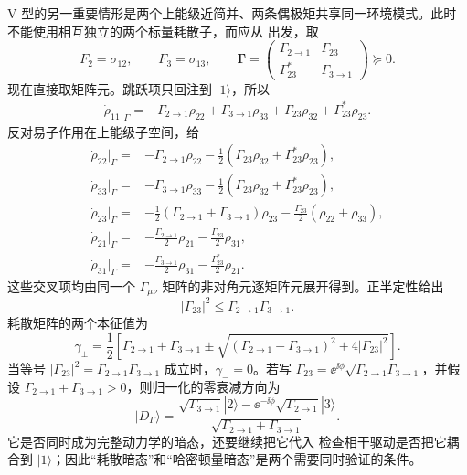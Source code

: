 \begin{exbox}[V 型]
V 型的另一重要情形是两个上能级近简并、两条偶极矩共享同一环境模式。此时不能使用相互独立的两个标量耗散子，而应从 出发，取
\[
F_2=\sigma_{12},\qquad F_3=\sigma_{13},
\qquad
\boldsymbol\Gamma=
\begin{pmatrix}
\Gamma_{2\to1}&\Gamma_{23}\\
\Gamma_{23}^*&\Gamma_{3\to1}
\end{pmatrix}\succeq0.
\]
现在直接取矩阵元。跳跃项只回注到 $|1\rangle$，所以
\begin{align}
\dot\rho_{11}\big|_{\Gamma}
={}&\Gamma_{2\to1}\rho_{22}+\Gamma_{3\to1}\rho_{33}
+\Gamma_{23}\rho_{32}+\Gamma_{23}^*\rho_{23}.
\end{align}
反对易子作用在上能级子空间，给
\begin{align}
\dot\rho_{22}\big|_{\Gamma}
={}&-\Gamma_{2\to1}\rho_{22}
-\frac12(\Gamma_{23}\rho_{32}+\Gamma_{23}^*\rho_{23}),\\
\dot\rho_{33}\big|_{\Gamma}
={}&-\Gamma_{3\to1}\rho_{33}
-\frac12(\Gamma_{23}\rho_{32}+\Gamma_{23}^*\rho_{23}),\\
\dot\rho_{23}\big|_{\Gamma}
={}&-\frac12(\Gamma_{2\to1}+\Gamma_{3\to1})\rho_{23}
-\frac{\Gamma_{23}}2(\rho_{22}+\rho_{33}),\\
\dot\rho_{21}\big|_{\Gamma}
={}&-\frac{\Gamma_{2\to1}}2\rho_{21}
-\frac{\Gamma_{23}}2\rho_{31},\\
\dot\rho_{31}\big|_{\Gamma}
={}&-\frac{\Gamma_{3\to1}}2\rho_{31}
-\frac{\Gamma_{23}^*}{2}\rho_{21}.
\end{align}
这些交叉项均由同一个 $\Gamma_{\mu\nu}$ 矩阵的非对角元逐矩阵元展开得到。正半定性给出
\[
|\Gamma_{23}|^2\le
\Gamma_{2\to1}\Gamma_{3\to1}.
\]
耗散矩阵的两个本征值为
\[
\gamma_{\pm}
=\frac12\left[
\Gamma_{2\to1}+\Gamma_{3\to1}
\pm
\sqrt{(\Gamma_{2\to1}-\Gamma_{3\to1})^2+4|\Gamma_{23}|^2}
\right].
\]
当等号 $|\Gamma_{23}|^2=\Gamma_{2\to1}\Gamma_{3\to1}$ 成立时，$\gamma_-=0$。若写
$\Gamma_{23}=\ee^{\ii\phi}\sqrt{\Gamma_{2\to1}\Gamma_{3\to1}}$，并假设
$\Gamma_{2\to1}+\Gamma_{3\to1}>0$，则归一化的零衰减方向为
\[
|D_{\Gamma}\rangle
=\frac{
\sqrt{\Gamma_{3\to1}}|2\rangle
-\ee^{-\ii\phi}\sqrt{\Gamma_{2\to1}}|3\rangle}
{\sqrt{\Gamma_{2\to1}+\Gamma_{3\to1}}}.
\]
它是否同时成为完整动力学的暗态，还要继续把它代入 检查相干驱动是否把它耦合到 $|1\rangle$；因此“耗散暗态”和“哈密顿量暗态”是两个需要同时验证的条件。
\end{exbox}

